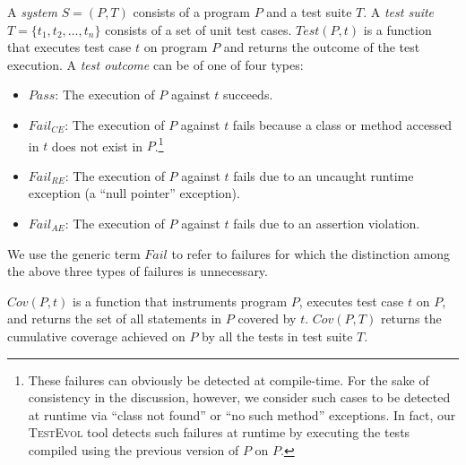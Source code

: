 \documentclass[conference]{IEEEtran}
\def\denseitems{
  \itemsep1pt plus1pt minus1pt
  \parsep0pt plus0pt
  \parskip0pt\topsep0pt}
\newcommand{\mt}{\mathit}
\newcommand{\pass}{\mt{Pass}}
\newcommand{\fail}{\mt{Fail}}
\newcommand{\failce}{\mt{Fail}_{CE}}
\newcommand{\failre}{\mt{Fail}_{RE}}
\newcommand{\failae}{\mt{Fail}_{AE}}
\newcommand{\testfunc}[2]{\mt{Test(#1, #2)}}
\newcommand{\covfunc}[2]{\mt{Cov(#1, #2)}}
\newcommand{\tool}{\textsc{TestEvol}\xspace}
\begin{document}
A \textit{system} $S = (P, T)$ consists of a program $P$ and a test
suite $T$.  A \textit{test suite} $T = \{t_1, t_2, \ldots, t_n\}$
consists of a set of unit test cases.
$\testfunc{P}{t}$ is a function that executes test case $t$ on program
$P$ and returns the outcome of the test execution.  A \textit{test
  outcome} can be of one of four types:

\begin{itemize}\denseitems

\item $\pass$: The execution of $P$ against $t$ succeeds.

\item $\failce$: The execution of $P$ against $t$ fails because a
  class or method accessed in $t$ does not exist in
  $P$.\footnote{\small These failures can obviously be detected at
    compile-time. For the sake of consistency in the discussion,
    however, we consider such cases to be detected at runtime via
    ``class not found'' or ``no such method'' exceptions. In fact, our
    \tool{} tool detects such failures at runtime by executing the
    tests compiled using the previous version of $P$ on $P$.}

\item $\failre$: The execution of $P$ against $t$ fails due to an
  uncaught runtime exception (\eg a ``null pointer'' exception).

\item $\failae$: The execution of $P$ against $t$ fails due to an
  assertion violation.

\end{itemize}

We use the generic term $\fail$ to refer to failures for which the
distinction among the above three types of failures is unnecessary.

$\covfunc{P}{t}$ is a function that instruments program $P$, executes
test case $t$ on $P$, and returns the set of all statements in $P$
covered by $t$. $\covfunc{P}{T}$ returns the cumulative coverage
achieved on $P$ by all the tests in test suite $T$.

\end{document}
